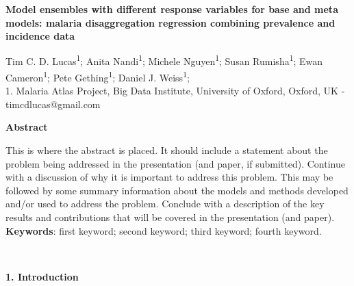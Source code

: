 \documentclass[11pt]{article}
\begin{document}
\templatefigures{}



\small{

\begin{center}
\textbf{Model ensembles with different response variables for base and meta models: malaria disaggregation regression combining prevalence and incidence data}
\end{center}



\begin{center}
{Tim C. D. Lucas\textsuperscript{1}; Anita Nandi\textsuperscript{1}; Michele Nguyen\textsuperscript{1}; 
Susan Rumisha\textsuperscript{1}; Ewan Cameron\textsuperscript{1}; Pete Gething\textsuperscript{1}; Daniel J. Weiss\textsuperscript{1};}\\
{1. Malaria Atlas Project, Big Data Institute, University of Oxford, Oxford, UK - timcdlucas@gmail.com}\\ 


\end{center}

\begin{center}
{\bf Abstract}
\end{center}

\setlength{\parindent}{0pt}

This is where the abstract is placed. It should include a statement about the problem being addressed in the presentation (and paper, if submitted). Continue with a discussion of why it is important to address this problem. This may be followed by some summary information about the models and methods developed and/or used to address the problem. Conclude with a description of the key results and contributions that will be covered in the presentation (and paper).\\


{\bf Keywords}: first keyword; second keyword; third keyword; fourth keyword.
}\\


\setlength{\parindent}{0pt}

{\bf 1. Introduction}


\end{document}
